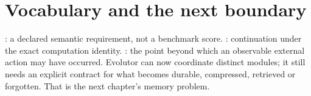 \section{Vocabulary and the next boundary}
: a declared semantic requirement, not a benchmark score.
: continuation under the exact computation identity.
: the point beyond which an observable external action
may have occurred. Evolutor can now coordinate distinct modules; it still
needs an explicit contract for what becomes durable, compressed, retrieved
or forgotten. That is the next chapter's memory problem.
